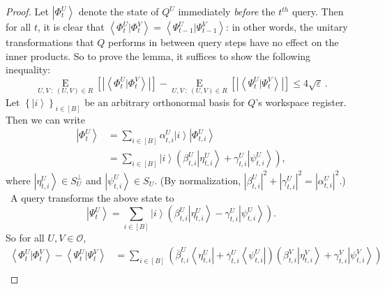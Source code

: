 \documentclass[10pt]{article}
\theoremstyle{definition}
\numberwithin{equation}{section}
\begin{document}
\begin{proof}
Let $\left\vert \Phi_{t}^{U}\right\rangle $ denote the state of $Q^{U}%
$ immediately \emph{before} the $t^{th}$ query. Then for all $t$, it is
clear that $\left\langle \Phi_{t}^{U}|\Phi_{t}^{V}\right\rangle =\left\langle
\Psi_{t-1}^{U}|\Psi_{t-1}^{V}\right\rangle $: in other words, the unitary
transformations that $Q$ performs in between query steps have no effect on
the inner products. So to prove the lemma, it suffices to show the following
inequality:%
\begin{equation}
\operatorname*{E}_{U,V~:~\left(  U,V\right)  \in R}\left[  \left\vert
\left\langle \Phi_{t}^{U}|\Phi_{t}^{V}\right\rangle \right\vert \right]
-\operatorname*{E}_{U,V~:~\left(  U,V\right)  \in R}\left[  \left\vert
\left\langle \Psi_{t}^{U}|\Psi_{t}^{V}\right\rangle \right\vert \right]
\leq4\sqrt{\varepsilon}\,. \tag{*}%
\end{equation}
Let $\left\{  \left\vert i\right\rangle \right\}  _{i\in\left[  B\right]  }%
$ be an arbitrary orthonormal basis for $Q$'s workspace register. Then we
can write%
\begin{align*}
\left\vert \Phi_{t}^{U}\right\rangle  &  =\sum_{i\in\left[  B\right]  }%
\alpha_{t,i}^{U}\left\vert i\right\rangle \left\vert \Phi_{t,i}^{U}%
\right\rangle \\
&  =\sum_{i\in\left[  B\right]  }\left\vert i\right\rangle \left(  \beta
_{t,i}^{U}\left\vert \eta_{t,i}^{U}\right\rangle +\gamma_{t,i}^{U}\left\vert
\psi_{t,i}^{U}\right\rangle \right)  ,
\end{align*}
where $\left\vert \eta_{t,i}^{U}\right\rangle \in S_{U}^{\bot}$ and
$\left\vert \psi_{t,i}^{U}\right\rangle \in S_{U}$. (By normalization,
$\left\vert \beta_{t,i}^{U}\right\vert ^{2}+\left\vert \gamma_{t,i}%
^{U}\right\vert ^{2}=\left\vert \alpha_{t,i}^{U}\right\vert ^{2}$.) \ A query
transforms the above state to%
\[
\left\vert \Psi_{t}^{U}\right\rangle =\sum_{i\in\left[  B\right]  }\left\vert
i\right\rangle \left(  \beta_{t,i}^{U}\left\vert \eta_{t,i}^{U}\right\rangle
-\gamma_{t,i}^{U}\left\vert \psi_{t,i}^{U}\right\rangle \right)  .
\]
So for all $U,V\in\mathcal{O}$,%
\begin{align*}
\left\langle \Phi_{t}^{U}|\Phi_{t}^{V}\right\rangle -\left\langle \Psi_{t}%
^{U}|\Psi_{t}^{V}\right\rangle  &  =\sum_{i\in\left[  B\right]  }\left(
\overline{\beta}_{t,i}^{U}\left\langle \eta_{t,i}^{U}\right\vert
+\overline{\gamma}_{t,i}^{U}\left\langle \psi_{t,i}^{U}\right\vert \right)
\left(  \beta_{t,i}^{V}\left\vert \eta_{t,i}^{V}\right\rangle +\gamma
_{t,i}^{V}\left\vert \psi_{t,i}^{V}\right\rangle \right) \\

\end{align*}
\end{proof}
\end{document}

